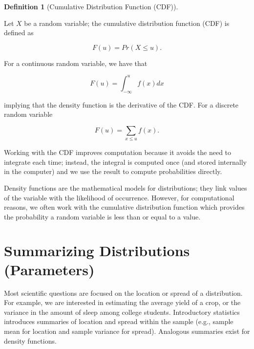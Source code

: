 \documentclass[
  letterpaper,
  DIV=11,
  numbers=noendperiod]{scrreprt}
\theoremstyle{definition}
\newtheorem{definition}{Definition}[chapter]
\theoremstyle{definition}
\theoremstyle{remark}
\begin{document}
\begin{definition}[Cumulative Distribution Function
(CDF)]\protect\hypertarget{def-cdf}{}\label{def-cdf}

Let \(X\) be a random variable; the cumulative distribution function
(CDF) is defined as

\[F(u) = Pr(X \leq u).\]

For a continuous random variable, we have that

\[F(u) = \int_{-\infty}^{u} f(x) dx\]

implying that the density function is the derivative of the CDF. For a
discrete random variable

\[F(u) = \sum_{x \leq u} f(x).\]

\end{definition}

Working with the CDF improves computation because it avoids the need to
integrate each time; instead, the integral is computed once (and stored
internally in the computer) and we use the result to compute
probabilities directly.

\begin{tcolorbox}[enhanced jigsaw, left=2mm, toprule=.15mm, arc=.35mm, breakable, opacitybacktitle=0.6, opacityback=0, rightrule=.15mm, colbacktitle=quarto-callout-tip-color!10!white, coltitle=black, leftrule=.75mm, toptitle=1mm, colframe=quarto-callout-tip-color-frame, titlerule=0mm, title=\textcolor{quarto-callout-tip-color}{\faLightbulb}\hspace{0.5em}{Big Idea}, bottomrule=.15mm, colback=white, bottomtitle=1mm]

Density functions are the mathematical models for distributions; they
link values of the variable with the likelihood of occurrence. However,
for computational reasons, we often work with the cumulative
distribution function which provides the probability a random variable
is less than or equal to a value.

\end{tcolorbox}

\hypertarget{summarizing-distributions-parameters}{%
\section{Summarizing Distributions
(Parameters)}\label{summarizing-distributions-parameters}}

Most scientific questions are focused on the location or spread of a
distribution. For example, we are interested in estimating the average
yield of a crop, or the variance in the amount of sleep among college
students. Introductory statistics introduces summaries of location and
spread within the sample (e.g., sample mean for location and sample
variance for spread). Analogous summaries exist for density functions.
\end{document}
